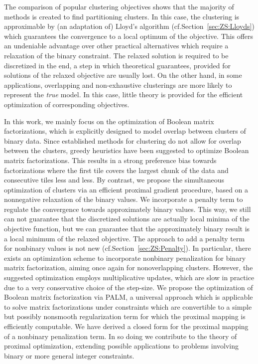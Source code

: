 The comparison of popular clustering objectives shows that the majority of methods is created to find partitioning clusters. In this case, the clustering is approximable by (an adaptation of) Lloyd's algorithm (cf.\@ Section~\ref{sec:ZS:Lloyds}) which guarantees the convergence to a local optimum of the objective. This offers an undeniable advantage over other practical alternatives which require a relaxation of the binary constraint. The relaxed solution is  required to be discretized in the end, a step in which theoretical guarantees, provided for solutions of the relaxed objective are usually lost. On the other hand, in some applications, overlapping and non-exhaustive clusterings are more likely to represent the \emph{true} model. In this case, little theory is provided for the efficient optimization of corresponding objectives.

In this work, we mainly focus on the optimization of Boolean matrix factorizations, which is explicitly designed to model overlap between clusters of binary data. Since established methods for clustering do not allow for overlap between the clusters, greedy heuristics have been suggested to optimize Boolean matrix factorizations. This results in a strong preference bias towards factorizations where the first tile covers the largest chunk of the data and consecutive tiles less and less. By contrast, we propose the simultaneous optimization of clusters via an efficient proximal gradient procedure, based on a nonnegative relaxation of the binary values. We incorporate a penalty term to regulate the convergence towards approximately binary values. This way, we still can not guarantee that the discretized solutions are actually local minima of the objective function, but we can guarantee that the approximately binary result is a local minimum of the relaxed objective. The approach to add a penalty term for nonbinary values is not new (cf.\@ Section~\ref{sec:ZS:Penalty}). In particular, there exists an optimization scheme to incorporate nonbinary penalization for binary matrix factorization, aiming once again for nonoverlapping clusters. However, the suggested optimization employs multiplicative updates, which are slow in practice due to a very conservative choice of the step-size. 
We propose the optimization of Boolean matrix factorization via PALM, a universal approach which is applicable to solve matrix factorizations under constraints which are convertible to a simple but possibly nonsmooth regularization term for which the proximal mapping is efficiently computable. We have derived a closed form for the proximal mapping of a nonbinary penalization term. In so doing we contribute to the theory of proximal optimization, extending possible applications to problems involving binary or more general integer constraints.

